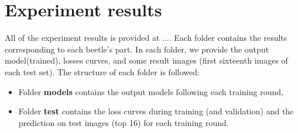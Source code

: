 \documentclass[12pt,a4paper]{article}
\begin{document}
\section{Experiment results}
All of the experiment results is provided at .... Each folder contains the results corresponding to each beetle's part. In each folder, we provide the output model(trained), losses curves, and some result images (first sixteenth images of each test set). The structure of each folder is followed:
\begin{itemize}
	\item Folder \textbf{models} contains the output models following each training round,
	\item Folder \textbf{test} contains the loss curves during training (and validation) and the prediction on test images (top 16) for each training round.
\end{itemize}
\end{document}
